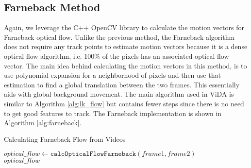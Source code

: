 \subsection{\label{subsection:farneback_method} Farneback Method}
Again, we leverage the C++ OpenCV library to calculate the motion vectors for
Farneback optical flow. Unlike the previous method, the Farneback algorithm does not require
any track points to estimate motion vectors because it is a dense optical flow
algorithm, i.e. 100\% of the pixels has an associated optical flow vector. The
main idea behind calculating the motion vectors in this method, is to use
polynomial expansion for a neighborhood of pixels \cite{farneback2003two} and
then use that estimation to find a global translation between the two frames. This
essentially aids with global background movement. The main algorithm used in ViDA
is similar to Algorithm \ref{alg:lk_flow} but contains fewer steps since there
is no need to get good features to track. The Farneback implementation is shown
in Algorithm \ref{alg:farneback}.

\begin{algorithm}
\caption{Calculating Farneback Flow from Videos}
\label{alg:farneback}
\begin{algorithmic}[1]
  \State $optical\_flow \gets \texttt{calcOpticalFlowFarneback}(frame1, frame2)$\\
  \Return $optical\_flow$
\EndProcedure
\end{algorithmic}
\end{algorithm}
